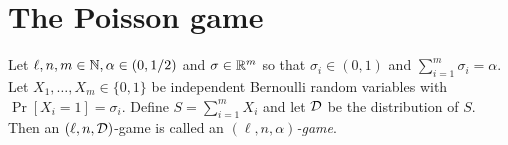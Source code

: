 





\section{The Poisson game}
  \begin{definition}\label{def:xor-game-poisson}
      Let $\ell, n, m \in \mathbb{N}, \alpha \in (0, 1/2)$ and 
      $\sigma \in \mathbb{R}^m$ so that $\sigma_i \in (0, 1)$ and $\sum_{i=1}^m \sigma_i = \alpha$. 
      Let $X_1, \ldots, X_m \in \{0,1\}$ be independent Bernoulli random variables with 
      $\Pr[X_i = 1] = \sigma_i$. 
      Define $S = \sum_{i = 1}^m X_i$ 
      and let $\mathcal{D}$ be the distribution of $S$.
      Then an $(\ell, n, \mathcal{D})$-game is called an 
      \emph{$(\ell, n, \alpha)$-game}.
  \end{definition}


